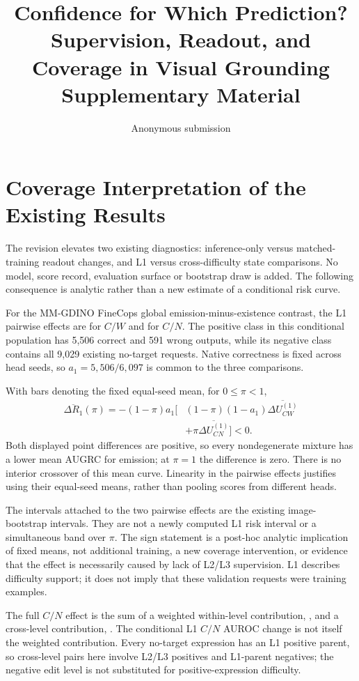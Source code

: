 \documentclass[10pt,twocolumn,letterpaper]{article}
\title{Confidence for Which Prediction?\\
Supervision, Readout, and Coverage in Visual Grounding\\
Supplementary Material}
\author{Anonymous submission}
\begin{document}
\maketitle
\renewcommand{\thesection}{\Alph{section}}


\section{Coverage Interpretation of the Existing Results}
The revision elevates two existing diagnostics: inference-only versus
matched-training readout changes, and L1 versus cross-difficulty state
comparisons. No model, score record, evaluation surface or bootstrap
draw is added. The following consequence is analytic rather than a
new estimate of a conditional risk curve.

For the MM-GDINO FineCops global emission-minus-existence contrast,
the L1 pairwise effects are \LoneCW{} for $C/W$ and \LoneCN{} for
$C/N$. The positive class in this conditional population has 5,506
correct and 591 wrong outputs, while its negative class contains all
9,029 existing no-target requests. Native correctness is fixed across
head seeds, so $a_1=5{,}506/6{,}097$ is common to the three comparisons.

With bars denoting the fixed equal-seed mean, for $0\leq\pi<1$,
\begin{align}
\overline{\Delta R_1}(\pi)
=-(1-\pi)a_1\big[&(1-\pi)(1-a_1)\overline{\Delta U_{CW}^{(1)}}\nonumber\\
&+\pi\overline{\Delta U_{CN}^{(1)}}\big]<0.
\end{align}
Both displayed point differences are positive, so every nondegenerate
mixture has a lower mean AUGRC for emission; at $\pi=1$ the difference
is zero. There is no interior crossover of this mean curve. Linearity
in the pairwise effects justifies using their equal-seed means, rather
than pooling scores from different heads.

The intervals attached to the two pairwise effects are the existing
image-bootstrap intervals. They are not a newly computed L1 risk
interval or a simultaneous band over $\pi$. The sign statement is a
post-hoc analytic implication of fixed means, not additional training,
a new coverage intervention, or evidence that the effect is necessarily
caused by lack of L2/L3 supervision. L1 describes difficulty support;
it does not imply that these validation requests were training examples.

The full $C/N$ effect is the sum of a weighted within-level contribution,
\WithinCN{}, and a cross-level contribution, \AcrossCN{}. The conditional
L1 $C/N$ AUROC change \LoneCN{} is not itself the weighted contribution.
Every no-target expression has an L1 positive parent, so cross-level
pairs here involve L2/L3 positives and L1-parent negatives; the negative
edit level is not substituted for positive-expression difficulty.
\end{document}
